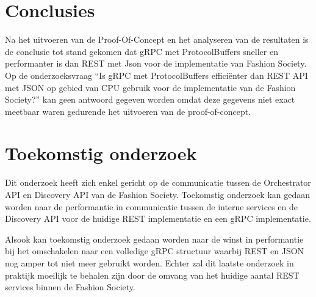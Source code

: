 \documentclass[a0,portrait]{a0poster}
\begin{document}
\begin{multicols}{2}



\color{HoGentAccent1} 
\section*{Conclusies}
\color{black}
Na het uitvoeren van de Proof-Of-Concept en het analyseren van de resultaten is de conclusie tot stand gekomen dat gRPC met ProtocolBuffers sneller en performanter is dan REST met Json voor de implementatie van Fashion Society. Op de onderzoeksvraag “Is gRPC met ProtocolBuffers efficiënter dan REST API met JSON op gebied van CPU gebruik voor de implementatie van de Fashion Society?” kan geen antwoord gegeven worden omdat deze gegevens niet exact meetbaar waren gedurende het uitvoeren van de proof-of-concept.
\color{HoGentAccent1} 
\section*{Toekomstig onderzoek}
\color{black}

Dit onderzoek heeft zich enkel gericht op de communicatie tussen de Orchestrator API en Discovery API van de Fashion Society. Toekomstig onderzoek kan gedaan worden naar de performantie in communicatie tussen de interne services en de Discovery API voor de huidige REST implementatie en een gRPC implementatie.

Alsook kan toekomstig onderzoek gedaan worden naar de winst in performantie bij het omschakelen naar een volledige gRPC structuur waarbij REST en JSON nog amper tot niet meer gebruikt worden. Echter zal dit laatste onderzoek in praktijk moeilijk te behalen zijn door de omvang van het huidige aantal REST services binnen de Fashion Society.



\end{multicols}
\end{document}
